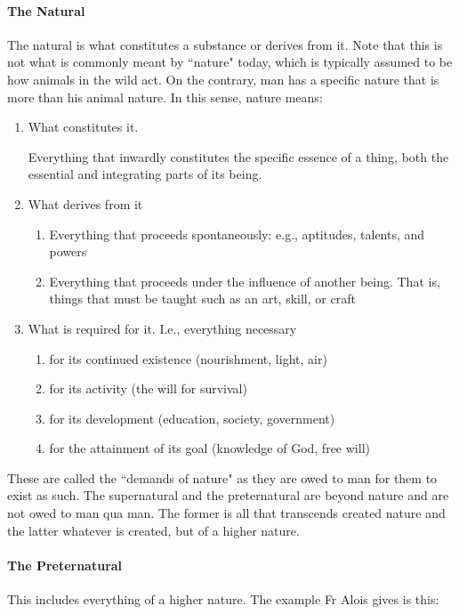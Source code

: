 \paragraph{The Natural}
The natural is what constitutes a substance or derives from it. Note that this is not what is commonly meant by ``nature" today, which is typically assumed to be how animals in the wild act. On the contrary, man has a specific nature that is more than his animal nature. In this sense, nature means:

\begin{enumerate}
\item What constitutes it.

Everything that inwardly constitutes the specific essence of a thing, both the essential and integrating parts of its being. 
\item What derives from it 

\begin{enumerate}
\item Everything that proceeds spontaneously: e.g., aptitudes, talents, and powers 
\item Everything that proceeds under the influence of another being. That is, things that must be taught such as an art, skill, or craft 
\end{enumerate}
\item What is required for it. I.e., everything necessary 

\begin{enumerate}
\item for its continued existence (nourishment, light, air) 
\item for its activity (the will for survival) 
\item for its development (education, society, government) 
\item for the attainment of its goal (knowledge of God, free will) 
\end{enumerate}
\end{enumerate}
These are called the ``demands of nature" as they are owed to man for them to exist as such. The supernatural and the preternatural are beyond nature and are not owed to man qua man. The former is all that transcends created nature and the latter whatever is created, but of a higher nature.

\paragraph{The Preternatural}
This includes everything of a higher nature. The example Fr Alois gives is this:

